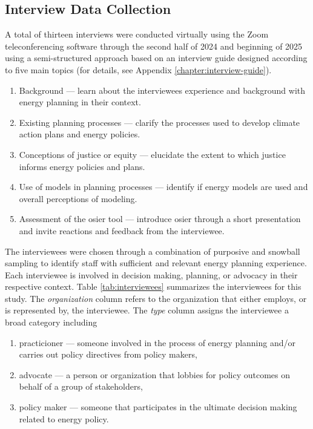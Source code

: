 \subsection{Interview Data Collection}

A total of thirteen interviews were conducted virtually using the Zoom
teleconferencing software through the second half of 2024 and beginning of 2025
using a semi-structured approach based on an interview guide designed according
to five main topics (for details, see Appendix \ref{chapter:interview-guide}).
\begin{enumerate}
    \item Background --- learn about the interviewees experience and background
    with energy planning in their context.
    \item Existing planning processes --- clarify the processes used to develop
    climate action plans and energy policies.
    \item Conceptions of justice or equity --- elucidate the extent to which
    justice informs energy policies and plans.
    \item Use of models in planning processes --- identify if energy models are
    used and overall perceptions of modeling.
    \item Assessment of the \ac{osier} tool --- introduce \ac{osier} through a
    short presentation and invite reactions and feedback from the interviewee.
\end{enumerate}
The interviewees were chosen through a combination of purposive and snowball
sampling to identify staff with sufficient and relevant energy planning
experience. Each interviewee is involved in decision making, planning, or
advocacy in their respective context. 
Table \ref{tab:interviewees} summarizes the interviewees for this study. The
\textit{organization} column refers to the organization that either employs, or is
represented by, the interviewee. The \textit{type} column assigns the
interviewee a broad category including
\begin{enumerate}
    \item practicioner --- someone involved in the process of energy planning
    and/or carries out policy directives from policy makers,
    \item advocate --- a person or organization that lobbies for policy outcomes
    on behalf of a group of stakeholders,
    \item policy maker --- someone that participates in the ultimate decision
    making related to energy policy.
\end{enumerate}
    
